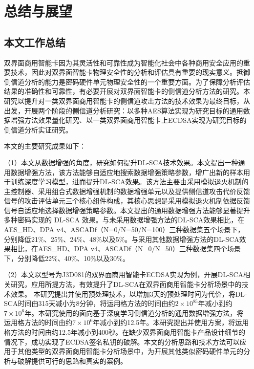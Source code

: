 \chapter{总结与展望}\label{chap:conclusion}{
	\section{本文工作总结}
	双界面商用智能卡因为其灵活性和可靠性成为智能化社会中各种商用安全应用的重要技术，因此对双界面智能卡物理安全性的分析和评估具有重要的现实意义。抵御侧信道分析的能力是密码硬件单元物理安全性的一个重要方面。为了保障分析评估结果的准确性和可靠性，有必要开展对双界面智能卡的侧信道分析方法的研究。本研究以提升对一类双界面商用智能卡的侧信道攻击方法的技术效果为最终目标，从\jiaodu 出发，开展两个阶段的侧信道分析研究：以多种AES算法实现为研究目标的通用数据增强方法效果量化研究、以一类双界面商用智能卡上ECDSA实现为研究目标的侧信道分析实证研究。
	
	本文的主要研究成果如下：
	
	（1）本文从数据增强的角度，研究如何提升DL-SCA技术效果。本文提出一种通用数据增强方法，该方法能够自适应地搜索数据增强策略参数，增广出新的样本用于训练深度学习模型，进而提升DL-SCA效果。该方法主要由采用模拟退火机制的主控制器、采用组合式数据增强机制的数据增强单元以及提供侧信道攻击代价反馈信号的攻击评估单元三个核心组件构成，其核心思想是采用模拟退火机制依据反馈信号自适应地选择数据增强策略参数。本文提出的通用数据增强方法能够显著提升多种密码实现的 DL-SCA 效果。与未采用数据增强方法的DL-SCA效果相比，在AES\_HD、DPA v4、ASCADf（N=0/N=50/N=100）三种数据集五个场景下，\chenggongtiaoshu 分别降低21\%、25\%、24\%、48\%以及5\%。与采用其他数据增强方法的DL-SCA效果相比，在AES\_HD、DPA v4、ASCADf（N=0/N=50）三种数据集四个场景下，\chenggongtiaoshu 分别降低22\%、40\%、10\%以及30\%。
	
	{\color{\xchange}
	（2）本文以型号为J3D081的双界面商用智能卡ECDSA实现为例，开展DL-SCA相关研究，应用所提方法，有效提升了DL-SCA在双界面商用智能卡分析场景中的技术效果。%
	本研究提出并使用\yuchuli 预处理技术，以增加3天的预处理时间为代价，将DL-SCA时间由315天减小为8分钟，将运用格方法的时间由约$2\times10^{85}$年减小到约$7\times10^{6}$年。本研究使用的面向基于深度学习侧信道分析的通用数据增强方法，将运用格方法的时间由约$7\times10^{6}$年减小到约12.5年。本研究提出并使用\jiashejianyanguji 方案，将运用格方法的时间由约12.5年减小到400秒。在缺少双界面商用智能卡产品设计细节的情况下，成功实现了ECDSA签名私钥的破解。本文的分析思路和技术方法可以应用于其他类型的双界面商用智能卡分析场景中，为开展其他类似密码硬件单元的分析与破解提供可行的思路和真实的案例。
	
}}

